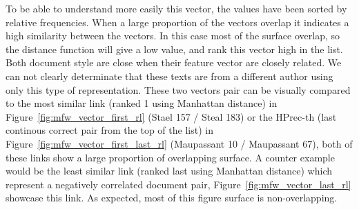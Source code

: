 To be able to understand more easily this vector, the values have been sorted by relative frequencies.
When a large proportion of the vectors overlap it indicates a high similarity between the vectors.
In this case most of the surface overlap, so the distance function will give a low value, and rank this vector high in the list.
Both document style are close when their feature vector are closely related.
We can not clearly determinate that these texts are from a different author using only this type of representation.
These two vectors pair can be visually compared to the most similar link (ranked 1 using Manhattan distance) in Figure~\ref{fig:mfw_vector_first_rl} (Stael 157 / Steal 183) or the HPrec-th (last continous correct pair from the top of the list) in Figure~\ref{fig:mfw_vector_first_last_rl} (Maupassant 10 / Maupassant 67), both of these links show a large proportion of overlapping surface.
A counter example would be the least similar link (ranked last using Manhattan distance) which represent a negatively correlated document pair, Figure~\ref{fig:mfw_vector_last_rl} showcase this link.
As expected, most of this figure surface is non-overlapping.

